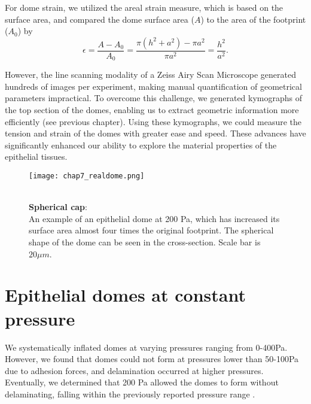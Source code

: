 For dome strain, we utilized the areal strain measure, which is based on the surface area, and compared the dome surface area ($A$) to the area of the footprint ($A_{0}$) by
\begin{equation}
	\label{eqn:arealstrain}
	\epsilon = \frac{A - A_{0}}{A_{0}} = \frac{\pi(h^2 + a^2) - \pi a^2}{\pi a^2} = \frac{h^2}{a^2} .
\end{equation}

However, the line scanning modality of a Zeiss Airy Scan Microscope generated hundreds of images per experiment, making manual quantification of geometrical parameters impractical. To overcome this challenge, we generated kymographs of the top section of the domes, enabling us to extract geometric information more efficiently (see previous chapter). Using these kymographs, we could measure the tension and strain of the domes with greater ease and speed. These advances have significantly enhanced our ability to explore the material properties of the epithelial tissues.


\begin{figure}
	\begin{minipage}[c]{0.7\textwidth}
		\texttt{[image: chap7\_realdome.png]}
	\end{minipage}\hfill
	\begin{minipage}[c]{0.27\textwidth}
		\caption{\\ \textbf{Spherical cap}:\\An example of an epithelial dome at 200 Pa, which has increased its surface area almost four times the original footprint. The spherical shape of the dome can be seen in the cross-section. Scale bar is  $20 \mu m$.
		} \label{fig_7_1}
	\end{minipage}
\end{figure}

\hypertarget{epithelial-domes-at-constant-pressure}{%
	\section{Epithelial domes at constant
		pressure}\label{epithelial-domes-at-constant-pressure}}

We systematically inflated domes at varying pressures ranging from 0-400\unit{\pascal}. However, we found that domes could not form at pressures lower than 50-100\unit{\pascal} due to adhesion forces, and delamination occurred at higher pressures. Eventually, we determined that 200 Pa allowed the domes to form without delaminating, falling within the previously reported pressure range \cite{choudhury2022,marin-llaurado2022}.

